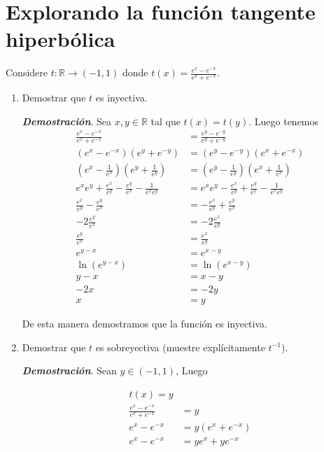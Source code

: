 \documentclass{report}
\begin{document}

    \pagebreak
    \section*{ Explorando la función tangente hiperbólica }

    Considere $t: \mathbb{R} \rightarrow (-1, 1)$ donde $t(x) = \frac{e^x-e^{-x}}{e^x+e^{-x}}$.

    \begin{enumerate}
        \item Demostrar que $t$ es inyectiva.

        \textit{\textbf{Demostración}}. Sea $x,y \in \mathbb{R}$ tal que $t(x) = t(y)$. Luego tenemos
        \begin{align*}
            \frac{e^x-e^{-x}}{e^x+e^{-x}} &= \frac{e^y-e^{-y}}{e^y+e^{-y}}\\
            (e^x-e^{-x})(e^y+e^{-y}) &= (e^y-e^{-y})(e^x+e^{-x})\\
            (e^x-\frac{1}{e^x})(e^y+\frac{1}{e^y}) &= (e^y-\frac{1}{e^y})(e^x+\frac{1}{e^x})\\
            e^xe^y+\frac{e^x}{e^y}-\frac{e^y}{e^x}-\frac{1}{e^xe^y}&=e^xe^y-\frac{e^x}{e^y}+\frac{e^y}{e^x}-\frac{1}{e^xe^y}\\
            \frac{e^x}{e^y}-\frac{e^y}{e^x} &= - \frac{e^x}{e^y}+\frac{e^y}{e^x}\\
            -2\frac{e^y}{e^x} &= -2\frac{e^x}{e^y}\\
            \frac{e^y}{e^x} &= \frac{e^x}{e^y}\\
            e^{y-x} &= e^{x-y}\\
            \ln(e^{y-x}) &= \ln(e^{x-y})\\
            y-x &= x-y\\
            -2x&=-2y\\
            x&=y
        \end{align*}

        De esta manera demostramos que la función es inyectiva.

        \item Demostrar que $t$ es sobreyectiva (muestre explícitamente $t^{-1}$).

        \textit{\textbf{Demostración}}. Sean $y \in (-1, 1)$, Luego

        \begin{align*}
            t(x) = y\\
            \frac{e^x-e^{-x}}{e^x+e^{-x}} &= y\\
            e^x-e^{-x} &= y(e^x+e^{-x})\\
            e^x-e^{-x} &= ye^x+ye^{-x}\\
            

\end{align*}
\end{enumerate}
\end{document}
